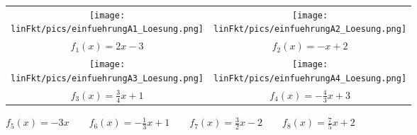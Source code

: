 \begin{Answer}[ref=lineareFktEinfuehrungA1]

	\begin{minipage}[t]{\textwidth}
		\begin{tabular}{cc}
			\centering
			\texttt{[image: \\linFkt/pics/einfuehrungA1\_Loesung.png]}&\texttt{[image: \\linFkt/pics/einfuehrungA2\_Loesung.png]}  \\
			\(f_1(x)=2x-3\)&	\(f_2(x)=-x+2\)  \\ \addlinespace[20pt]
			\texttt{[image: \\linFkt/pics/einfuehrungA3\_Loesung.png]}&\texttt{[image: \\linFkt/pics/einfuehrungA4\_Loesung.png]}  \\
			\(f_3(x)=\frac{3}{4}x+1\)&	\(f_4(x)=-\frac{4}{3}x+3\)  \\
		\end{tabular}
	\end{minipage}
\end{Answer}
\begin{Answer}[ref=lineareFktEinfuehrungA2]

	\(f_5(x)=-3x\qquad f_6(x)=-\frac{1}{3}x+1\qquad f_7(x)=\frac{3}{2}x-2\qquad f_8(x)=\frac{7}{5}x+2\)
\end{Answer}